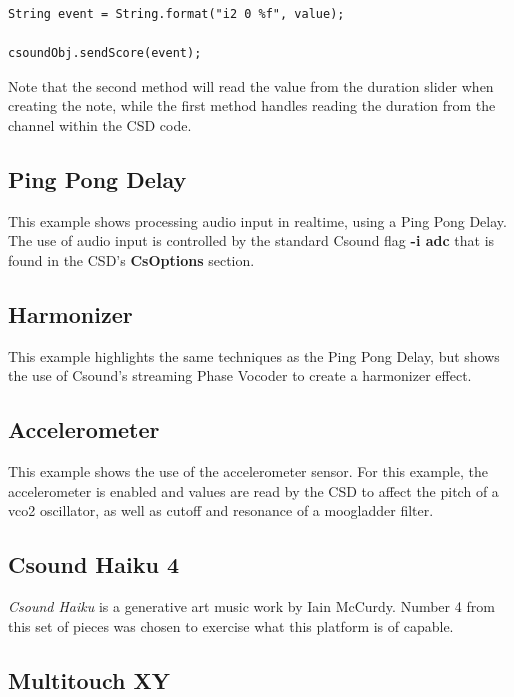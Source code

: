 \documentclass[11pt]{article}
\begin{document}
\begin{lstlisting}[caption=Example code showing sending score text to CsoundObj]
String event = String.format("i2 0 %f", value);
									
csoundObj.sendScore(event);
\end{lstlisting}

Note that the second method will read the value from the duration slider when creating the note, while the first method handles reading the duration from the channel within the CSD code. 

\subsection{Ping Pong Delay}

This example shows processing audio input in realtime, using a Ping Pong Delay. The use of audio input is controlled by the standard Csound flag \textbf{-i adc} that is found in the CSD's \textbf{CsOptions} section.  


\subsection{Harmonizer}

This example highlights the same techniques as the Ping Pong Delay, but shows the use of Csound's streaming Phase Vocoder to create a harmonizer effect. 

\subsection{Accelerometer}

This example shows the use of the accelerometer sensor.  For this example, the accelerometer is enabled and values are read by the CSD to affect the pitch of a vco2 oscillator, as well as cutoff and resonance of a moogladder filter. 

\subsection{Csound Haiku 4}

\emph{Csound Haiku} is a generative art music work by Iain McCurdy.  Number 4 from this set of pieces was chosen to exercise what this platform is of capable.

\subsection{Multitouch XY}
\end{document}
